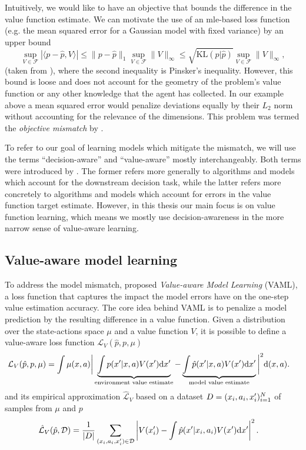 Intuitively, we would like to have an objective that bounds the difference in the value function estimate.
We can motivate the use of an \ac{mle}-based loss function (e.g. the mean squared error for a Gaussian model with fixed variance) {by an upper bound}
$$\sup_{V \in \mathcal{F}}|\langle p - \hat{p}, V\rangle|\leq \|p - \hat{p}\|_1 \sup_{V \in \mathcal{F}}\|V\|_\infty \leq \sqrt{\text{KL}(p|\hat{p})}\sup_{V \in \mathcal{F}}\|V\|_\infty,$$
(taken from
\textcite{vaml}), where the second inequality is Pinsker's inequality.
However, this bound is loose and does not account for the geometry of the problem's value function or any other knowledge that the agent has collected. 
In our example above a mean squared error would penalize deviations equally by their $L_2$ norm without accounting for the relevance of the dimensions.
This problem was termed the \emph{objective mismatch} by \textcite{lambert202objective}.

To refer to our goal of learning models which mitigate the mismatch, we will use the terms ``decision-aware'' and ``value-aware'' mostly interchangeably.
Both terms were introduced by \textcite{vaml}.
The former refers more generally to algorithms and models which account for the downstream decision task, while the latter refers more concretely to algorithms and models which account for errors in the value function target estimate.
However, in this thesis our main focus is on value function learning, which means we mostly use decision-awareness in the more narrow sense of value-aware learning.

\subsection{Value-aware model learning}

To address the model mismatch, \textcite{vaml} proposed \emph{Value-aware Model Learning} (VAML), a loss function that captures the impact the model errors have on the one-step value estimation accuracy.
The core idea behind VAML is to penalize a model prediction by the resulting difference in a value function. Given a distribution over the state-actions space $\mu$ and a value function $V$, it is possible to define a value-aware loss function $\mathcal{L}_V(\hat{p}, p, \mu)$
\begin{align}
    &\mathcal{L}_V(\hat{p}, p, \mu) = \int \mu(x,a) \bigg|\underbrace{\int p(x'|x,a)V(x')\mathrm{d}x'}_{\text{environment value estimate}}  - \underbrace{\int \hat{p}(x'|x,a) V(x') \mathrm{d}x'}_{\text{model value estimate}}\bigg|^2 \mathrm{d} (x,a).
\end{align}
and its empirical approximation $\hat{\mathcal{L}}_V$ based on a dataset $D = (x_i,a_i,x'_i)_{i=1}^N$ of samples from $\mu$ and $p$
\begin{align}
    &\hat{\mathcal{L}}_V(\hat{p}, \mathcal{D}) = \frac{1}{|D|}\sum_{(x_i,a_i,x'_i)\in\mathcal{D}} \left|V(x'_i) - \int \hat{p}(x'|x_i,a_i) V(x') \mathrm{d} x'\right|^2\label{eq:background:IterVAMLloss}.
\end{align}

